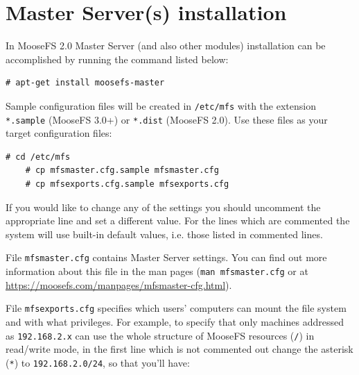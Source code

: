 \documentclass[a4paper,11pt,english]{report}
\def\code#1{\texttt{#1}}
\begin{document}
		\section{Master Server(s) installation}
			\bigskip
			
			\begin{center}
			\textbf{}
			\end{center}
			
			\bigskip
			\bigskip
			
			In MooseFS 2.0 Master Server (and also other modules) installation can be accomplished by running the command listed below:
			
			\begin{lstlisting}[caption={Installing Master Server}]
	# apt-get install moosefs-master
			\end{lstlisting}
			
			
			Sample configuration files will be created in \code{/etc/mfs} with the extension \code{*.sample} (MooseFS 3.0+) or \code{*.dist} (MooseFS 2.0). Use these files as your target configuration files:
			
			\begin{lstlisting}[caption={Copying default config files as target configuration files (MooseFS 3.0)}]
	# cd /etc/mfs
	# cp mfsmaster.cfg.sample mfsmaster.cfg
	# cp mfsexports.cfg.sample mfsexports.cfg
			\end{lstlisting}
			
			
			
			If you would like to change any of the settings you should uncomment the appropriate line and set a different value. For the lines which are commented the system will use built-in default values, i.e. those listed in commented lines.
			
			File \code{mfsmaster.cfg} contains Master Server settings. You can find out more information about this file in the man pages (\code{man mfsmaster.cfg} or at \url{https://moosefs.com/manpages/mfsmaster-cfg.html}).
			
			File \code{mfsexports.cfg} specifies which users' computers can mount the file system and with what
			privileges. For example, to specify that only machines addressed as \code{192.168.2.x} can use the whole structure of MooseFS resources (\code{/}) in read/write mode, in the first line which is not commented out change the asterisk (\code{*}) to \code{192.168.2.0/24}, so that you'll have:
			
\end{document}
